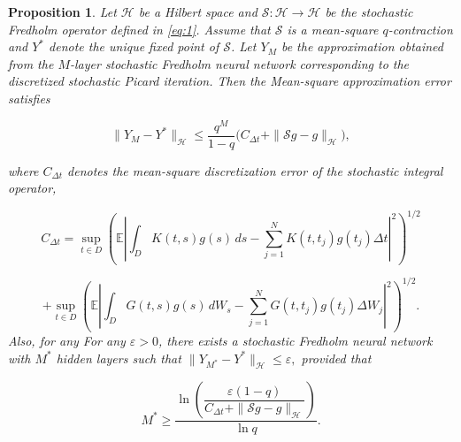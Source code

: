 \documentclass[10pt,a4paper]{amsart}
\newtheorem{proposition}{Proposition}
\begin{document}
\begin{proposition}
\label{prop:error}
Let $\mathcal H$ be a Hilbert space and  
$\mathcal S:\mathcal H\to\mathcal H$ be the stochastic Fredholm operator defined in \eqref{eq:1}. 
Assume that $\mathcal S$ is a mean-square $q$-contraction and $Y^\ast$ denote the unique fixed point of $\mathcal S$. Let $Y_M$ be the approximation obtained from the $M$-layer stochastic 
Fredholm neural network corresponding to the discretized stochastic 
Picard iteration. Then the Mean-square approximation error satisfies

\begin{equation}
	\|Y_M-Y^\ast\|_{\mathcal H}
	\le
	\frac{q^M}{1-q}
	\Big(
	C_{\Delta t}
	+
	\|\mathcal S g-g\|_{\mathcal H}
	\Big),
	\label{eq:2.21}
\end{equation}

where $C_{\Delta t}$ denotes the mean-square discretization error of the stochastic integral operator,

\[
C_{\Delta t}
=
\sup_{t\in D}
\left(
\mathbb E
\left|
\int_D K(t,s)g(s)\,ds
-
\sum_{j=1}^{N}K(t,t_j)g(t_j)\Delta t
\right|^2
\right)^{1/2}
\]

\[
+
\sup_{t\in D}
\left(
\mathbb E
\left|
\int_D G(t,s)g(s)\,dW_s
-
\sum_{j=1}^{N}G(t,t_j)g(t_j)\Delta W_j
\right|^2
\right)^{1/2}.
\]
Also, for any For any $\varepsilon>0$, there exists a stochastic Fredholm neural network 
with $M^\ast$ hidden layers such that $
\|Y_{M^\ast}-Y^\ast\|_{\mathcal H}\le\varepsilon,
$ provided that

\begin{equation}
	M^\ast
	\ge
	\frac{
		\ln\!\left(
		\dfrac{\varepsilon(1-q)}
		{C_{\Delta t}+\|\mathcal S g-g\|_{\mathcal H}}
		\right)
	}{\ln q}.
	\label{eq:2.23}
\end{equation}
\end{proposition}
\end{document}
